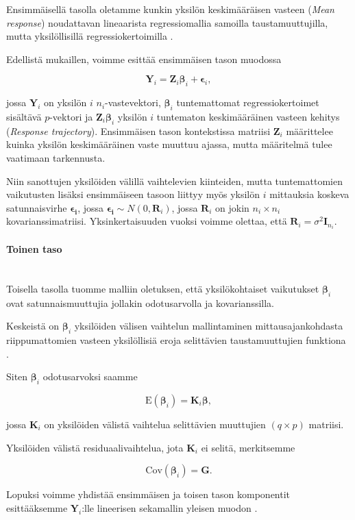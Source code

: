 \documentclass[finnish]{docopts}
\begin{document}
Ensimmäisellä tasolla oletamme kunkin yksilön keskimääräisen vasteen (\textit{Mean response}) noudattavan lineaarista regressiomallia samoilla taustamuuttujilla, mutta yksilöllisillä regressiokertoimilla \cite{fitzmaurice11}. 

Edellistä mukaillen, voimme esittää ensimmäisen tason muodossa

$$
\bm{Y}_i = \bm{Z}_i \bm{\beta}_i + \bm{\epsilon}_i,
$$

jossa $\bm{Y}_i$ on yksilön $i$ $n_i$-vastevektori, $\bm{\beta}_i$ tuntemattomat regressiokertoimet sisältävä $p$-vektori ja $\bm{Z}_i \bm{\beta}_i$ yksilön $i$ tuntematon keskimääräinen vasteen kehitys (\textit{Response trajectory}). Ensimmäisen tason kontekstissa matriisi $\bm{Z}_i$ määrittelee kuinka yksilön keskimääräinen vaste muuttuu ajassa, mutta määritelmä tulee vaatimaan tarkennusta.

Niin sanottujen yksilöiden välillä vaihtelevien kiinteiden, mutta tuntemattomien vaikutusten lisäksi ensimmäiseen tasoon liittyy myös yksilön $i$ mittauksia koskeva satunnaisvirhe $\bm{\epsilon_i}$, jossa $\bm{\epsilon_i} \sim N(0,\bm{R}_i)$, jossa $\bm{R}_i$ on jokin $n_i \times n_i$ kovarianssimatriisi. Yksinkertaisuuden vuoksi voimme olettaa, että $\bm{R}_i = \sigma^2\bm{I}_{n_i}.$

\paragraph{Toinen taso}\mbox{}\\

Toisella tasolla tuomme malliin oletuksen, että yksilökohtaiset vaikutukset $\bm{\beta}_i$ ovat satunnaismuuttujia jollakin odotusarvolla ja kovarianssilla.

Keskeistä on $\bm{\beta}_i$ yksilöiden välisen vaihtelun mallintaminen mittausajankohdasta riippumattomien vasteen yksilöllisiä eroja selittävien taustamuuttujien funktiona \cite{fitzmaurice11}.

Siten $\bm{\beta}_i$ odotusarvoksi saamme

$$
\text{E}(\bm{\beta}_i) = \bm{K}_i \bm{\beta},
$$

jossa $\bm{K}_i$ on yksilöiden välistä vaihtelua selittävien muuttujien $(q \times p)$ matriisi.

Yksilöiden välistä residuaalivaihtelua, jota $\bm{K}_i$ ei selitä, merkitsemme

$$
\text{Cov}(\bm{\beta}_i) = \bm{G}.
$$

Lopuksi voimme yhdistää ensimmäisen ja toisen tason komponentit esittääksemme $\bm{Y}_i$:lle lineerisen sekamallin yleisen muodon \cite{fitzmaurice11, verbeke00}.
\end{document}
